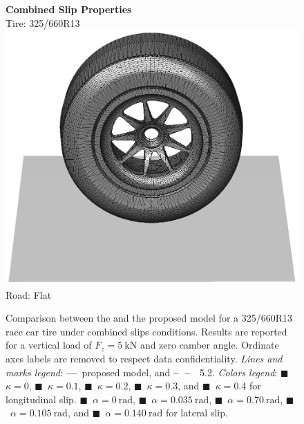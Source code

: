 \begin{figure}
  \centering
  \begin{minipage}[c]{0.70\linewidth}
    \raggedleft
  \end{minipage}%
  \hfill
  \begin{minipage}[c]{0.29\linewidth}
    \centering
    \textbf{Combined Slip Properties} \\[0.4em]
    Tire: 325/660R13 \\[0.4em]
    \includegraphics[width=1.0\linewidth, trim={17.25cm 4.25cm 15.25cm 7.0cm}, clip]{./figures/chapter_4/render_flat}
    Road: Flat
  \end{minipage}
  \caption{Comparison between the \MagicFormulae{} and the proposed model for a 325/660R13 race car tire under combined slips conditions. Results are reported for a vertical load of $F_z = \SI{5}{\kilo\newton}$ and zero camber angle. Ordinate axes labels are removed to respect data confidentiality. \emph{Lines and marks legend}: \textbf{---}~proposed model, and \textbf{--~--}~\MagicFormulae{}~5.2. \emph{Colors legend}: \textcolor{mycolor1}{$\blacksquare$}~$\kappa = 0$, \textcolor{mycolor2}{$\blacksquare$}~$\kappa = 0.1$, \textcolor{mycolor3}{$\blacksquare$}~$\kappa = 0.2$, \textcolor{mycolor4}{$\blacksquare$}~$\kappa = 0.3$, and \textcolor{mycolor5}{$\blacksquare$}~$\kappa = 0.4$ for longitudinal slip. \textcolor{mycolor1}{$\blacksquare$}~$\alpha = \SI{0}{\radian}$, \textcolor{mycolor2}{$\blacksquare$}~$\alpha = \SI{0.035}{\radian}$, \textcolor{mycolor3}{$\blacksquare$}~$\alpha = \SI{0.70}{\radian}$, \textcolor{mycolor4}{$\blacksquare$}~$\alpha = \SI{0.105}{\radian}$, and \textcolor{mycolor5}{$\blacksquare$}~$\alpha = \SI{0.140}{\radian}$ for lateral slip.}
  \label{chap4:fig:racecar_combined}
\end{figure}

